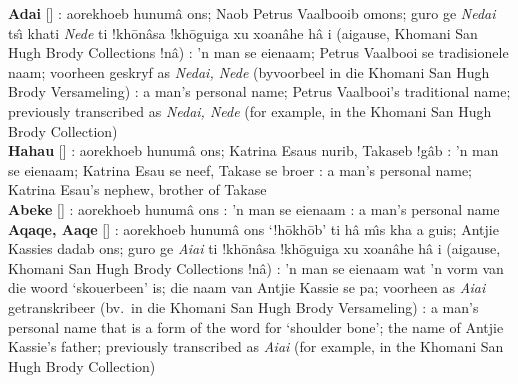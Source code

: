 \textbf{\textvertline{}Adai} []
: aorekhoeb \textdoublebarpipe{}hunum\^{a}
\textvertline{}ons; \textdoublevertline{}Naob Petrus Vaalbooib
om\textvertline{}ons; \textdoublebarpipe{}guro ge
\emph{N\textvertline{}edai} ts\^{\i} \textdoublevertline{}khati
\emph{N\textvertline{}ede} ti !kh\={o}\textdoublevertline{}n\^{a}sa
!kh\={o}\textdoublevertline{}guiga xu xoa\textdoublevertline{}n\^{a}he
h\^{a} i (ai\textdoublevertline{}gause, \textdoublebarpipe{}Khomani
San Hugh Brody Collections !n\^{a}) : 'n man se eienaam;
Petrus Vaalbooi se tradisionele naam; voorheen geskryf as
\emph{N\textvertline{}edai, N\textvertline{}ede} (byvoorbeel in die
\textdoublebarpipe{}Khomani San Hugh Brody Versameling)
: a man's personal name; Petrus Vaalbooi's traditional
name; previously transcribed as \emph{N\textvertline{}edai,
N\textvertline{}ede} (for example, in the \textdoublebarpipe{}Khomani
San Hugh Brody Collection) \\

\textbf{\textvertline{}Ha\textvertline{}hau}
[]
: aorekhoeb \textdoublebarpipe{}hunum\^{a}
\textvertline{}ons; Katrina Esaus \textdoublevertline{}nurib, Takaseb
!g\^{a}b : 'n man se eienaam; Katrina Esau se neef,
Takase se broer : a man's personal name; Katrina Esau's
nephew, brother of Takase \\

\textbf{\textdoublevertline{}Abeke}
[] :
aorekhoeb \textdoublebarpipe{}hunum\^{a} \textvertline{}ons
: 'n man se eienaam : a man's personal
name \\

\textbf{\textdoublevertline{}Aq\textdoublevertline{}aqe,
\textdoublevertline{}A\textdoublevertline{}aqe}
[]
: aorekhoeb \textdoublebarpipe{}hunum\^{a}
\textvertline{}ons `!h\={o}\textdoublebarpipe{}kh\={o}b' ti h\^{a}
m\^{\i}s \textvertline{}kha a \textvertline{}guis; Antjie Kassies
dadab \textvertline{}ons; \textdoublebarpipe{}guro ge
\emph{\textdoublevertline{}Ai\textdoublevertline{}ai} ti
!kh\={o}\textdoublevertline{}n\^{a}sa
!kh\={o}\textdoublevertline{}guiga xu xoa\textdoublevertline{}n\^{a}he
h\^{a} i (ai\textdoublevertline{}gause, \textdoublebarpipe{}Khomani
San Hugh Brody Collections !n\^{a}) : 'n man se eienaam
wat 'n vorm van die woord `skouerbeen' is; die naam van Antjie Kassie
se pa; voorheen as
\emph{\textdoublevertline{}Ai\textdoublevertline{}ai} getranskribeer
(bv.\ in die \textdoublebarpipe{}Khomani San Hugh Brody Versameling)
: a man's personal name that is a form of the word for
`shoulder bone'; the name of Antjie Kassie's father; previously
transcribed as \emph{\textdoublevertline{}Ai\textdoublevertline{}ai}
(for example, in the \textdoublebarpipe{}Khomani San Hugh Brody
Collection) \\

